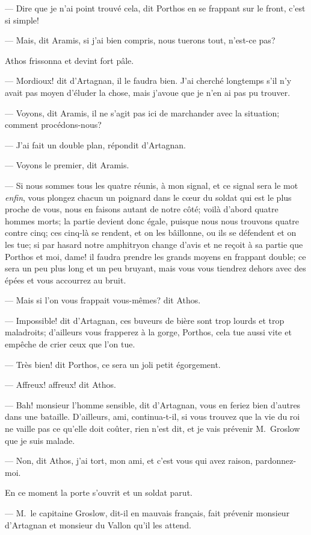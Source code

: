 — Dire que je n'ai point trouvé cela, dit Porthos en se frappant sur le front, c'est si simple!

— Mais, dit Aramis, si j'ai bien compris, nous tuerons tout, n'est-ce pas?

Athos frissonna et devint fort pâle.

— Mordioux! dit d'Artagnan, il le faudra bien. J'ai cherché longtemps s'il n'y avait pas moyen d'éluder la chose, mais j'avoue que je n'en ai pas pu trouver.

— Voyons, dit Aramis, il ne s'agit pas ici de marchander avec la situation; comment procédons-nous?

— J'ai fait un double plan, répondit d'Artagnan.

— Voyons le premier, dit Aramis.

— Si nous sommes tous les quatre réunis, à mon signal, et ce signal sera le mot \textit{enfin}, vous plongez chacun un poignard dans le cœur du soldat qui est le plus proche de vous, nous en faisons autant de notre côté; voilà d'abord quatre hommes morts; la partie devient donc égale, puisque nous nous trouvons quatre contre cinq; ces cinq-là se rendent, et on les bâillonne, ou ils se défendent et on les tue; si par hasard notre amphitryon change d'avis et ne reçoit à sa partie que Porthos et moi, dame! il faudra prendre les grands moyens en frappant double; ce sera un peu plus long et un peu bruyant, mais vous vous tiendrez dehors avec des épées et vous accourrez au bruit.

— Mais si l'on vous frappait vous-mêmes? dit Athos.

— Impossible! dit d'Artagnan, ces buveurs de bière sont trop lourds et trop maladroits; d'ailleurs vous frapperez à la gorge, Porthos, cela tue aussi vite et empêche de crier ceux que l'on tue.

— Très bien! dit Porthos, ce sera un joli petit égorgement.

— Affreux! affreux! dit Athos.

— Bah! monsieur l'homme sensible, dit d'Artagnan, vous en feriez bien d'autres dans une bataille. D'ailleurs, ami, continua-t-il, si vous trouvez que la vie du roi ne vaille pas ce qu'elle doit coûter, rien n'est dit, et je vais prévenir M.~Groslow que je suis malade.

— Non, dit Athos, j'ai tort, mon ami, et c'est vous qui avez raison, pardonnez-moi.

En ce moment la porte s'ouvrit et un soldat parut.

— M.~le capitaine Groslow, dit-il en mauvais français, fait prévenir monsieur d'Artagnan et monsieur du Vallon qu'il les attend.

